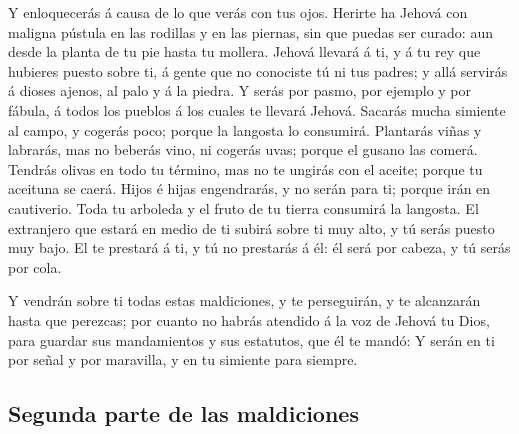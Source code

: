  Y enloquecerás á causa de lo que verás con tus ojos.
 Herirte ha Jehová con maligna pústula en las rodillas y en
las piernas, sin que puedas ser curado: aun desde la planta de tu pie
hasta tu mollera.  Jehová llevará á ti, y á tu rey que
hubieres puesto sobre ti, á gente que no conociste tú ni tus padres; y
allá servirás á dioses ajenos, al palo y á la piedra.  Y
serás por pasmo, por ejemplo y por fábula, á todos los pueblos á los
cuales te llevará Jehová.  Sacarás mucha simiente al campo,
y cogerás poco; porque la langosta lo consumirá.  Plantarás
viñas y labrarás, mas no beberás vino, ni cogerás uvas; porque el gusano
las comerá.  Tendrás olivas en todo tu término, mas no te
ungirás con el aceite; porque tu aceituna se caerá.  Hijos
é hijas engendrarás, y no serán para ti; porque irán en cautiverio.
 Toda tu arboleda y el fruto de tu tierra consumirá la
langosta.  El extranjero que estará en medio de ti subirá
sobre ti muy alto, y tú serás puesto muy bajo.  El te
prestará á ti, y tú no prestarás á él: él será por cabeza, y tú serás
por cola.

 Y vendrán sobre ti todas estas maldiciones, y te
perseguirán, y te alcanzarán hasta que perezcas; por cuanto no habrás
atendido á la voz de Jehová tu Dios, para guardar sus mandamientos y sus
estatutos, que él te mandó:  Y serán en ti por señal y por
maravilla, y en tu simiente para siempre.

\hypertarget{segunda-parte-de-las-maldiciones}{%
\subsection{Segunda parte de las
maldiciones}\label{segunda-parte-de-las-maldiciones}}

